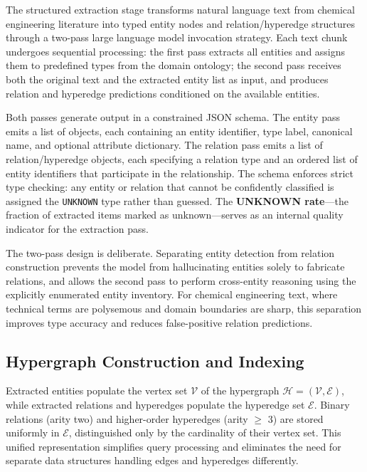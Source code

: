 \documentclass[11pt,a4paper]{article}
\begin{document}
The structured extraction stage transforms natural language text from chemical engineering literature into typed entity nodes and relation/hyperedge structures through a two-pass large language model invocation strategy. Each text chunk undergoes sequential processing: the first pass extracts all entities and assigns them to predefined types from the domain ontology; the second pass receives both the original text and the extracted entity list as input, and produces relation and hyperedge predictions conditioned on the available entities.

Both passes generate output in a constrained JSON schema. The entity pass emits a list of objects, each containing an entity identifier, type label, canonical name, and optional attribute dictionary. The relation pass emits a list of relation/hyperedge objects, each specifying a relation type and an ordered list of entity identifiers that participate in the relationship. The schema enforces strict type checking: any entity or relation that cannot be confidently classified is assigned the \texttt{UNKNOWN} type rather than guessed. The \textbf{UNKNOWN rate}---the fraction of extracted items marked as unknown---serves as an internal quality indicator for the extraction pass.

The two-pass design is deliberate. Separating entity detection from relation construction prevents the model from hallucinating entities solely to fabricate relations, and allows the second pass to perform cross-entity reasoning using the explicitly enumerated entity inventory. For chemical engineering text, where technical terms are polysemous and domain boundaries are sharp, this separation improves type accuracy and reduces false-positive relation predictions.

\subsection{Hypergraph Construction and Indexing}
\label{subsec:construction}

Extracted entities populate the vertex set $\mathcal{V}$ of the hypergraph $\mathcal{H} = (\mathcal{V}, \mathcal{E})$, while extracted relations and hyperedges populate the hyperedge set $\mathcal{E}$. Binary relations (arity two) and higher-order hyperedges (arity $\geq$ 3) are stored uniformly in $\mathcal{E}$, distinguished only by the cardinality of their vertex set. This unified representation simplifies query processing and eliminates the need for separate data structures handling edges and hyperedges differently.
\end{document}

